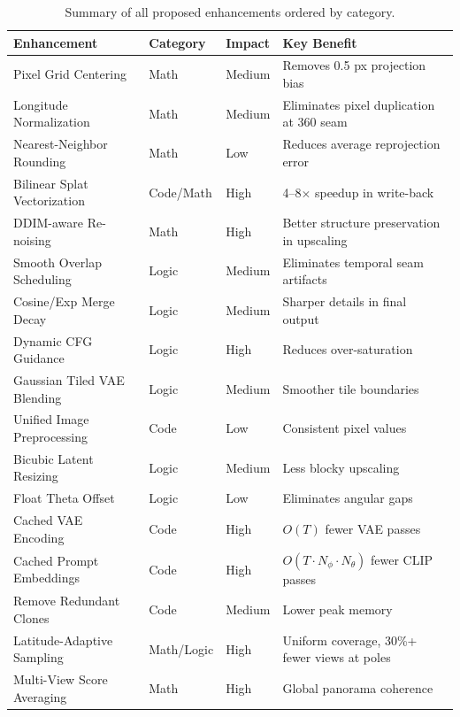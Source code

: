 \documentclass[11pt,a4paper]{article}
\begin{document}
\begin{table}[H]
\centering
\footnotesize
\renewcommand{\arraystretch}{1.2}
\begin{tabular}{@{}p{}p{}p{}p{}@{}}
\toprule
\textbf{Enhancement} & \textbf{Category} & \textbf{Impact} & \textbf{Key Benefit} \\
\midrule
Pixel Grid Centering & Math & Medium & Removes 0.5 px projection bias \\
Longitude Normalization & Math & Medium & Eliminates pixel duplication at 360\textdegree{} seam \\
Nearest-Neighbor Rounding & Math & Low & Reduces average reprojection error \\
Bilinear Splat Vectorization & Code/Math & High & 4--8$\times$ speedup in write-back \\
DDIM-aware Re-noising & Math & High & Better structure preservation in upscaling \\
Smooth Overlap Scheduling & Logic & Medium & Eliminates temporal seam artifacts \\
Cosine/Exp Merge Decay & Logic & Medium & Sharper details in final output \\
Dynamic CFG Guidance & Logic & High & Reduces over-saturation \\
Gaussian Tiled VAE Blending & Logic & Medium & Smoother tile boundaries \\
Unified Image Preprocessing & Code & Low & Consistent pixel values \\
Bicubic Latent Resizing & Logic & Medium & Less blocky upscaling \\
Float Theta Offset & Logic & Low & Eliminates angular gaps \\
Cached VAE Encoding & Code & High & $O(T)$ fewer VAE passes \\
Cached Prompt Embeddings & Code & High & $O(T \!\cdot\! N_\phi \!\cdot\! N_\theta)$ fewer CLIP passes \\
Remove Redundant Clones & Code & Medium & Lower peak memory \\
Latitude-Adaptive Sampling & Math/Logic & High & Uniform coverage, 30\%+ fewer views at poles \\
Multi-View Score Averaging & Math & High & Global panorama coherence \\
\bottomrule
\end{tabular}
\caption{Summary of all proposed enhancements ordered by category.}
\end{table}
\end{document}
